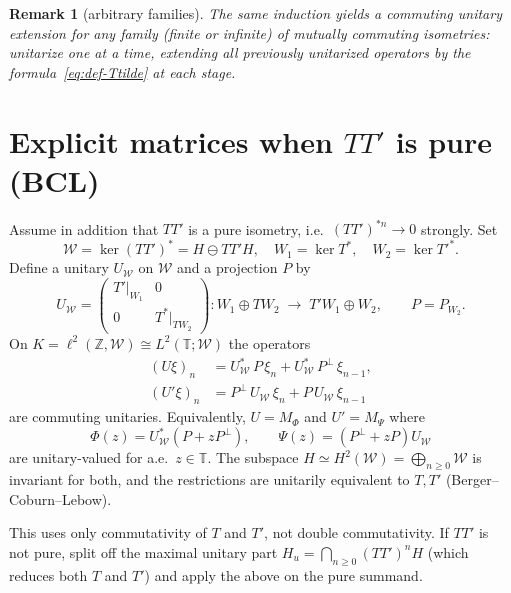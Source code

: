 \documentclass[11pt]{article}
\newtheorem{remark}[theorem]{Remark}
\begin{document}
\begin{remark}[arbitrary families]
The same induction yields a commuting unitary extension for any family
(finite or infinite) of mutually commuting isometries: unitarize one at a time,
extending all previously unitarized operators by the formula~\eqref{eq:def-Ttilde}
at each stage.
\end{remark}

\bigskip
\section*{Explicit matrices when \(TT'\) is pure (BCL)}

Assume in addition that \(TT'\) is a pure isometry, i.e.\
\((TT')^{*n}\to 0\) strongly. Set
\[
\mathcal{W}=\ker(TT')^*=H\ominus TT'H,
\quad
W_1=\ker T^*,
\quad
W_2=\ker{T'}^*.
\]
Define a unitary \(U_{\mathcal{W}}\) on \(\mathcal{W}\) and a projection \(P\) by
\begin{equation}
\label{eq:UW}
U_{\mathcal{W}}
=
\begin{pmatrix}
T'\big|_{W_1} & 0 \\
0 & T^*\big|_{TW_2}
\end{pmatrix}
:
W_1\oplus TW_2
\;\longrightarrow\;
T'W_1\oplus W_2,
\qquad
P=P_{W_2}.
\end{equation}
On \(K=\ell^2(\mathbb{Z},\mathcal{W})\cong L^2(\mathbb{T};\mathcal{W})\) the operators
\begin{equation}
\label{eq:BCL}
\boxed{
\begin{aligned}
(U\xi)_n
&=
U_{\mathcal{W}}^*\,P\,\xi_n
+
U_{\mathcal{W}}^*\,P^\perp\,\xi_{n-1},
\\[1mm]
(U'\xi)_n
&=
P^\perp\,U_{\mathcal{W}}\,\xi_n
+
P\,U_{\mathcal{W}}\,\xi_{n-1}
\end{aligned}
}
\end{equation}
are commuting unitaries. Equivalently, \(U=M_{\Phi}\) and \(U'=M_{\Psi}\) where
\[
\Phi(z)=U_{\mathcal{W}}^*(P+zP^\perp),
\qquad
\Psi(z)=(P^\perp+zP)U_{\mathcal{W}}
\]
are unitary-valued for a.e.\ \(z\in\mathbb{T}\). The subspace
\(H\simeq H^2(\mathcal{W})=\bigoplus_{n\ge 0}\mathcal{W}\) is invariant for both, and
the restrictions are unitarily equivalent to \(T,T'\) (Berger--Coburn--Lebow).

This uses only commutativity of \(T\) and \(T'\), not double commutativity.
If \(TT'\) is not pure, split off the maximal unitary part
\(H_u=\bigcap_{n\ge 0}(TT')^n H\) (which reduces both \(T\) and \(T'\)) and apply
the above on the pure summand.
\end{document}
